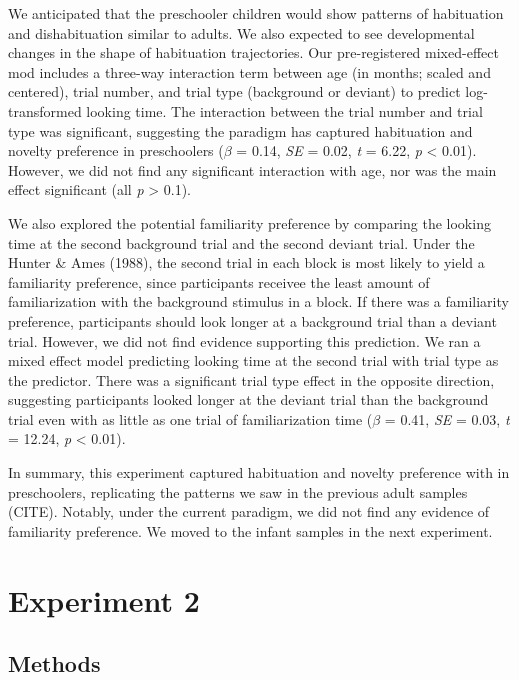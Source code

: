 \documentclass[10pt, letterpaper]{article}
\begin{document}
We anticipated that the preschooler children would show patterns of
habituation and dishabituation similar to adults. We also expected to
see developmental changes in the shape of habituation trajectories. Our
pre-registered mixed-effect mod includes a three-way interaction term
between age (in months; scaled and centered), trial number, and trial
type (background or deviant) to predict log-transformed looking time.
The interaction between the trial number and trial type was significant,
suggesting the paradigm has captured habituation and novelty preference
in preschoolers (\(\beta\) = 0.14, \emph{SE} = 0.02, \emph{t} = 6.22,
\emph{p} \textless{} 0.01). However, we did not find any significant
interaction with age, nor was the main effect significant (all \emph{p}
\textgreater{} 0.1).

We also explored the potential familiarity preference by comparing the
looking time at the second background trial and the second deviant
trial. Under the Hunter \& Ames (1988), the second trial in each block
is most likely to yield a familiarity preference, since participants
receivee the least amount of familiarization with the background
stimulus in a block. If there was a familiarity preference, participants
should look longer at a background trial than a deviant trial. However,
we did not find evidence supporting this prediction. We ran a mixed
effect model predicting looking time at the second trial with trial type
as the predictor. There was a significant trial type effect in the
opposite direction, suggesting participants looked longer at the deviant
trial than the background trial even with as little as one trial of
familiarization time (\(\beta\) = 0.41, \emph{SE} = 0.03, \emph{t} =
12.24, \emph{p} \textless{} 0.01).

In summary, this experiment captured habituation and novelty preference
with in preschoolers, replicating the patterns we saw in the previous
adult samples (CITE). Notably, under the current paradigm, we did not
find any evidence of familiarity preference. We moved to the infant
samples in the next experiment.

\hypertarget{experiment-2}{%
\section{Experiment 2}\label{experiment-2}}

\hypertarget{methods-1}{%
\subsection{Methods}\label{methods-1}}
\end{document}

